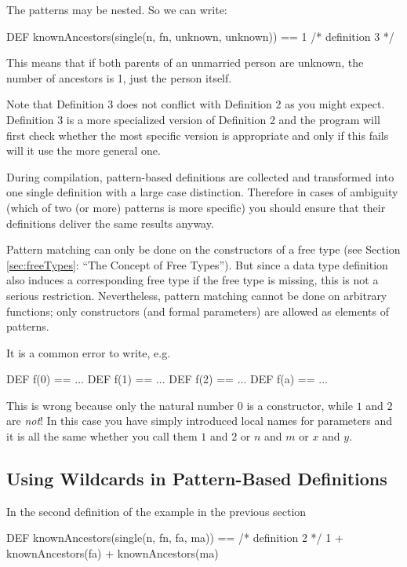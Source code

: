 The patterns may be nested. So we can write:
\begin{prog}
        DEF knownAncestors(single(n, fn, unknown, unknown)) == 1   
                                                 /* definition 3 */
\end{prog}
This means that if both parents of an unmarried person are unknown, the
number of ancestors is 1, just the person itself.

 Note that Definition 3 does not conflict with Definition 2 as you
might expect. 
Definition 3 is a more specialized version of Definition 2 and the
program will first check whether the most specific version is appropriate
and only if this fails will it use the more general one.

During compilation, pattern-based definitions are collected and
transformed into one single definition with a large case distinction.
Therefore in cases of ambiguity (which of two (or more) patterns is
more specific) you should ensure that their definitions deliver the
same results anyway.


\important Pattern matching can only be done on the constructors of a
free type (see Section \ref{sec:freeTypes}: ``The Concept of Free
Types'').
 But since a data type definition also induces a corresponding free type if
the free type is missing, this is not a serious restriction. 
Nevertheless, pattern matching cannot be done on arbitrary functions;
only constructors (and formal parameters) are allowed as elements of patterns.

It is a common error to write, e.g.
\begin{prog}
  DEF f(0) == ...
  DEF f(1) == ...
  DEF f(2) == ...
  DEF f(a) == ...
\end{prog}
This is wrong because only the natural number $0$ is a constructor,
while $1$ and $2$ are {\em not\/}! 
In this case you have simply introduced local names for parameters  and
it is all the same whether you call them $1$ and $2$ or $n$ and $m$ or $x$
and $y$.  


\subsection{Using Wildcards in Pattern-Based Definitions}
\label{sec:wildcard}
\advanced
In the second definition of the example in the previous section 
\begin{prog}
  DEF knownAncestors(single(n, fn, fa, ma)) ==    /* definition 2 */
              1 + knownAncestors(fa) + knownAncestors(ma)
\end{prog}

